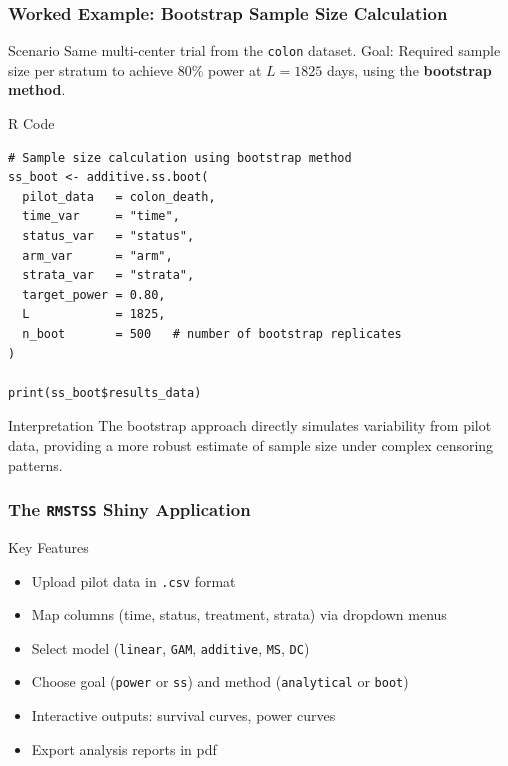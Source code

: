 \documentclass{beamer}
\begin{document}
\begin{frame}[fragile]
\frametitle{Worked Example: Bootstrap Sample Size Calculation}

\begin{block}{Scenario}
Same multi-center trial from the \texttt{colon} dataset.  
Goal: Required sample size per stratum to achieve $80\%$ power at $L = 1825$ days,  
using the \textbf{bootstrap method}.
\end{block}

\begin{block}{R Code}
\scriptsize
\begin{verbatim}
# Sample size calculation using bootstrap method
ss_boot <- additive.ss.boot(
  pilot_data   = colon_death,
  time_var     = "time",
  status_var   = "status",
  arm_var      = "arm",
  strata_var   = "strata",
  target_power = 0.80,
  L            = 1825,
  n_boot       = 500   # number of bootstrap replicates
)

print(ss_boot$results_data)
\end{verbatim}
\end{block}

\begin{block}{Interpretation}
The bootstrap approach directly simulates variability from pilot data,  
providing a more robust estimate of sample size under complex censoring patterns.
\end{block}
\end{frame}


\begin{frame}
\frametitle{The \texttt{RMSTSS} Shiny Application}

\begin{block}{Key Features}
\begin{itemize}
  \item Upload pilot data in \texttt{.csv} format
  \item Map columns (time, status, treatment, strata) via dropdown menus
  \item Select model (\texttt{linear}, \texttt{GAM}, \texttt{additive}, \texttt{MS}, \texttt{DC})
  \item Choose goal (\texttt{power} or \texttt{ss}) and method (\texttt{analytical} or \texttt{boot})
  \item Interactive outputs: survival curves, power curves
  \item Export analysis reports in pdf
\end{itemize}
\end{block}

\end{frame}
\end{document}
